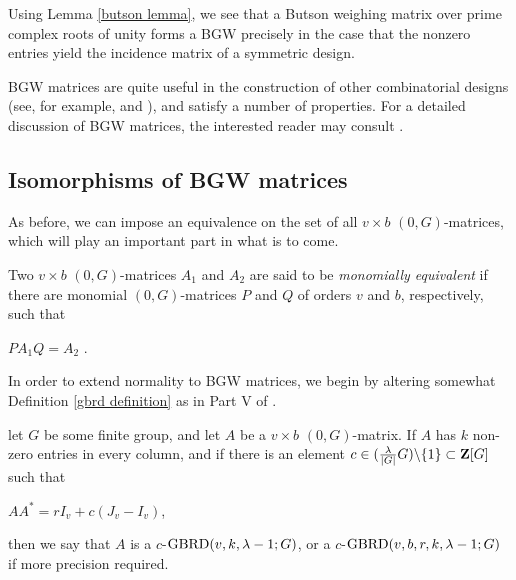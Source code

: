 \documentclass[../../../main]{subfiles}
\begin{document}
Using Lemma \ref{butson lemma}, we see that a Butson weighing matrix over prime
complex roots of unity forms a BGW precisely in the case that the nonzero
entries yield the incidence matrix of a symmetric design.

BGW matrices are quite useful in the construction of other combinatorial designs
(see, for example, \citeauthor{ionin-kharaghani-drad}
\citeyear{ionin-kharaghani-drad} and \citeyear{ionin-kharaghani-srg}), and
satisfy a number of properties. For a detailed discussion of BGW matrices, the
interested reader may consult \cite{combinatorics-of-symmetric-designs}.

\dinkus


\subsection{Isomorphisms of BGW matrices}

As before, we can impose an equivalence on the set of all $v \times b$ $(0,G)$-matrices, which will play an important part in what is to come. 

\begin{defin}\label{monomial-equiv}
  Two $v \times b$ $(0,G)$-matrices $A_1$ and $A_2$ are said to be {\it monomially equivalent} if there are monomial $(0,G)$-matrices $P$ and $Q$ of orders $v$ and $b$, respectively, such that 
  \begin{defenum}
  \item $PA_1Q=A_2$ .
  \end{defenum}
\end{defin}

 In order to extend normality to BGW matrices, we begin by altering somewhat Definition \ref{gbrd definition} as in Part V of \cite{handbook}.
 
 \begin{defin}\label{c-gbrd defintion}
   let $G$ be some finite group, and let $A$ be a $v \times b$ $(0,G)$-matrix. If $A$ has $k$ non-zero entries in every column, and if there is an element $c \in (\frac{\lambda}{|G|}G)\backslash\{1\} \subset \mathbf{Z}[G]$ such that
  \begin{defenum}
   \item\label{c-gbrd-eq} $AA^* = rI_v + c(J_v - I_v)$,
  \end{defenum}
  then we say that $A$ is a $c$-$\text{GBRD}(v,k,\lambda-1;G)$, or a $c$-$\text{GBRD}(v,b,r,k,\lambda-1;G)$ if more precision required.
 \end{defin}
 
\end{document}
